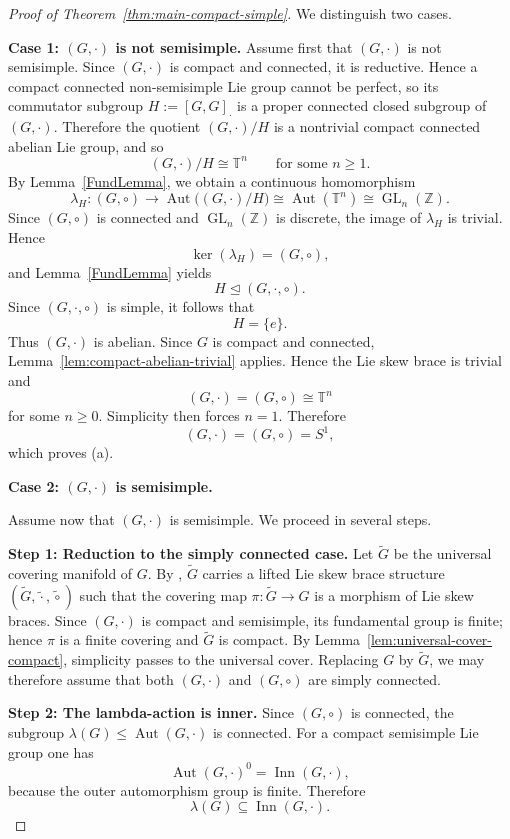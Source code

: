 \documentclass[reqno]{amsart}
\DeclareMathOperator{\Inn}{Inn}
\DeclareMathOperator{\Aut}{Aut}
\DeclareMathOperator{\GL}{GL}
\begin{document}
\begin{proof}[Proof of Theorem~\ref{thm:main-compact-simple}]
We distinguish two cases.

\medskip
\noindent
\textbf{Case 1: \((G,\cdot)\) is not semisimple.}
Assume first that \((G,\cdot)\) is not semisimple. Since \((G,\cdot)\) is
compact and connected, it is reductive. Hence a compact connected
non-semisimple Lie group cannot be perfect, so its commutator subgroup
$H:=[G,G]_{\cdot}$
is a proper connected closed subgroup of \((G,\cdot)\).
Therefore the quotient \((G,\cdot)/H\) is a nontrivial compact connected
abelian Lie group, and so
\[
(G,\cdot)/H\cong \mathbb{T}^{n}
\qquad\text{for some }n\ge 1.
\]
By Lemma~\ref{FundLemma}, we obtain a continuous homomorphism
\[
\lambda_H:(G,\circ)\longrightarrow \Aut\bigl((G,\cdot)/H\bigr)
\cong \Aut(\mathbb{T}^{n})
\cong \GL_n(\mathbb{Z}).
\]
Since \((G,\circ)\) is connected and \(\GL_n(\mathbb{Z})\) is discrete, the
image of \(\lambda_H\) is trivial. Hence
\[
\ker(\lambda_H)=(G,\circ),
\]
and Lemma~\ref{FundLemma} yields
\[
H\trianglelefteq (G,\cdot,\circ).
\]
Since \((G,\cdot,\circ)\) is simple, it follows that
\[
H=\{e\}.
\]
Thus \((G,\cdot)\) is abelian. Since \(G\) is compact and connected,
Lemma~\ref{lem:compact-abelian-trivial} applies. Hence the Lie skew brace is
trivial and
\[
(G,\cdot)=(G,\circ)\cong \mathbb{T}^{n}
\]
for some \(n\ge 0\). Simplicity then forces \(n=1\). Therefore
\[
(G,\cdot)=(G,\circ)=S^{1},
\]
which proves \textup{(a)}.

\medskip
\noindent
\textbf{Case 2: \((G,\cdot)\) is semisimple.}

Assume now that \((G,\cdot)\) is semisimple. We proceed in several steps.

\medskip
\noindent
\textbf{Step 1: Reduction to the simply connected case.}
Let \(\widetilde G\) be the universal covering manifold of \(G\). By
\cite[Lemma~3.2]{DameleLoi2026}, \(\widetilde G\) carries a lifted Lie skew
brace structure
$(\widetilde G,\widetilde\cdot,\widetilde\circ)$
such that the covering map
$\pi:\widetilde G\to G$
is a morphism of Lie skew braces. Since \((G,\cdot)\) is compact and
semisimple, its fundamental group is finite; hence \(\pi\) is a finite
covering and \(\widetilde G\) is compact. By
Lemma~\ref{lem:universal-cover-compact}, simplicity passes to the universal
cover. Replacing \(G\) by \(\widetilde G\), we may therefore assume that both
\((G,\cdot)\) and \((G,\circ)\) are simply connected.

\medskip
\noindent
\textbf{Step 2: The lambda-action is inner.}
Since \((G,\circ)\) is connected, the subgroup \(\lambda(G)\leq \Aut(G,\cdot)\)
is connected. For a compact semisimple Lie group one has
\[
\Aut(G,\cdot)^0=\Inn(G,\cdot),
\]
because the outer automorphism group is finite. Therefore
\[
\lambda(G)\subseteq \Inn(G,\cdot).
\]


\end{proof}
\end{document}
